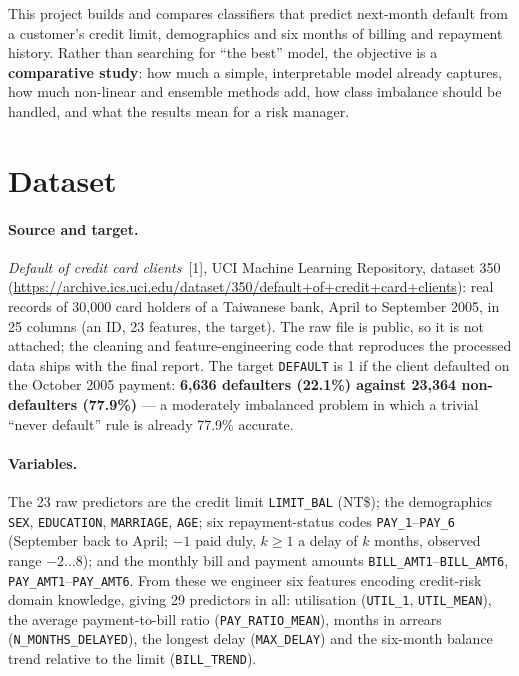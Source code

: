 \documentclass{article}
\begin{document}
This project builds and compares classifiers that predict next-month default from
a customer's credit limit, demographics and six months of billing and repayment
history. Rather than searching for ``the best'' model, the objective is a
\textbf{comparative study}: how much a simple, interpretable model already
captures, how much non-linear and ensemble methods add, how class imbalance
should be handled, and what the results mean for a risk manager.

\section{Dataset}

\paragraph{Source and target.}
\emph{Default of credit card clients}~[1], UCI Machine Learning Repository,
dataset 350 (\url{https://archive.ics.uci.edu/dataset/350/default+of+credit+card+clients}):
real records of 30,000 card holders of a Taiwanese bank, April to September 2005,
in 25 columns (an ID, 23 features, the target). The raw file is public, so it is
not attached; the cleaning and feature-engineering code that reproduces the
processed data ships with the final report. The target \texttt{DEFAULT} is 1 if
the client defaulted on the October 2005 payment:
\textbf{6,636 defaulters (22.1\%) against 23,364 non-defaulters (77.9\%)} --- a
moderately imbalanced problem in which a trivial ``never default'' rule is
already 77.9\% accurate.

\paragraph{Variables.}
The 23 raw predictors are the credit limit \texttt{LIMIT\_BAL} (NT\$); the
demographics \texttt{SEX}, \texttt{EDUCATION}, \texttt{MARRIAGE}, \texttt{AGE};
six repayment-status codes \texttt{PAY\_1}--\texttt{PAY\_6} (September back to
April; $-1$ paid duly, $k \ge 1$ a delay of $k$ months, observed range $-2 \dots
8$); and the monthly bill and payment amounts
\texttt{BILL\_AMT1}--\texttt{BILL\_AMT6}, \texttt{PAY\_AMT1}--\texttt{PAY\_AMT6}.
From these we engineer six features encoding credit-risk domain knowledge, giving
29 predictors in all: utilisation (\texttt{UTIL\_1}, \texttt{UTIL\_MEAN}), the
average payment-to-bill ratio (\texttt{PAY\_RATIO\_MEAN}), months in arrears
(\texttt{N\_MONTHS\_DELAYED}), the longest delay (\texttt{MAX\_DELAY}) and the
six-month balance trend relative to the limit (\texttt{BILL\_TREND}).
\end{document}
